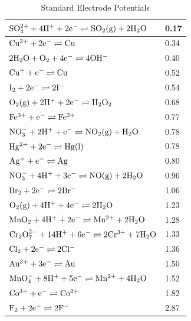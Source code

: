 \begin{table}[p]
\begin{center}
\begin{tabular}{|l|l|}
$\rm{SO_{4}^{2+} + 4H^{+} + 2e^{-} \rightleftharpoons SO_{2} (g) + 2H_{2}O }$& 0.17 \\ \hline
$\rm{Cu^{2+} + 2e^{-} \rightleftharpoons Cu }$& 0.34 \\ \hline
$\rm{2H_{2}O + O_{2} + 4e^{-} \rightleftharpoons 4OH^{-} }$& 0.40 \\ \hline
$\rm{Cu^{+} + e^{-} \rightleftharpoons Cu }$& 0.52 \\ \hline
$\rm{I_{2} + 2e^{-} \rightleftharpoons 2I^{-} }$& 0.54 \\ \hline
$\rm{O_{2} (g) + 2H^{+} + 2e^{-} \rightleftharpoons H_{2}O_{2} }$& 0.68 \\ \hline
$\rm{Fe^{3+} + e^{-} \rightleftharpoons Fe^{2+}  }$& 0.77 \\ \hline
$\rm{NO_{3}^{-} + 2H^{+} + e^{-} \rightleftharpoons NO_{2} (g) + H_{2}O }$& 0.78 \\ \hline
$\rm{Hg^{2+} + 2e^{-} \rightleftharpoons Hg (l) }$& 0.78 \\ \hline
$\rm{Ag^{+} + e^{-} \rightleftharpoons Ag }$& 0.80 \\ \hline
$\rm{NO_{3}^{-} + 4H^{+} +3 e^{-} \rightleftharpoons NO (g) + 2H_{2}O }$& 0.96 \\ \hline
$\rm{Br_{2} + 2e^{-} \rightleftharpoons 2Br^{-} }$& 1.06 \\ \hline
$\rm{O_{2} (g) + 4H^{+} + 4e^{-} \rightleftharpoons 2H_{2}O }$& 1.23 \\ \hline
$\rm{MnO_{2} + 4H^{+} + 2e^{-} \rightleftharpoons Mn^{2+} + 2H_{2}O }$& 1.28 \\ \hline
$\rm{Cr_{2}O_{7}^{2-} + 14H^{+} + 6e^{-} \rightleftharpoons 2Cr^{3+} + 7H_{2}O }$& 1.33 \\ \hline
$\rm{Cl_{2} + 2e^{-} \rightleftharpoons 2Cl^{-} }$& 1.36 \\ \hline
$\rm{Au^{3+} + 3e^{-} \rightleftharpoons Au }$& 1.50 \\ \hline
$\rm{MnO_{4}^{-} + 8H^{+} + 5e^{-} \rightleftharpoons Mn^{2+} + 4H_{2}O }$& 1.52 \\ \hline
$\rm{Co^{3+} + e^{-} \rightleftharpoons Co^{2+} }$& 1.82 \\ \hline
$\rm{F_{2} + 2e^{-} \rightleftharpoons 2F^{-} }$& 2.87 \\ \hline
\end{tabular}
\end{center}
\caption{Standard Electrode Potentials} 
\label{tab:electrochemical:table sep}
\end{table}

